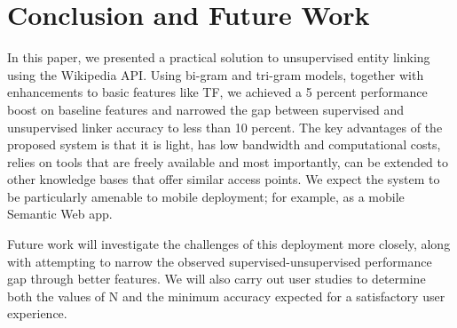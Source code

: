 \documentclass[runningheads,a4paper]{llncs}
\begin{document}
\section{Conclusion and Future Work}\label{conclusion}
In this paper, we presented a practical solution to unsupervised entity linking using the Wikipedia API. Using bi-gram and tri-gram models, together with enhancements to basic features like TF, we achieved a 5 percent performance boost on baseline features and narrowed the gap between supervised and unsupervised linker accuracy to less than 10 percent. The key advantages of the proposed system is that it is light, has low bandwidth and computational costs, relies on tools that are freely available and most importantly, can be extended to other knowledge bases that offer similar access points. We expect the system to be particularly amenable to mobile deployment; for example, as a mobile Semantic Web app.

Future work will investigate the challenges of this deployment more closely, along with attempting to narrow the observed supervised-unsupervised performance gap through better features. We will also carry out user studies to determine both the values of N and the minimum accuracy expected for a satisfactory user experience.    




\end{document}

